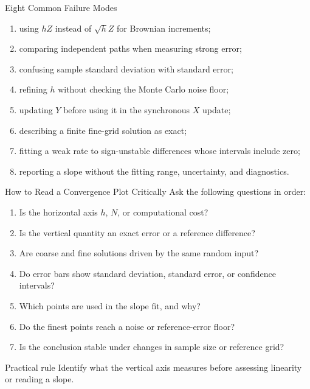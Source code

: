 \documentclass[aspectratio=169,10pt]{beamer}
\begin{document}
\begin{frame}{Eight Common Failure Modes}
  \begin{enumerate}
    \item using $hZ$ instead of $\sqrt h Z$ for Brownian increments;
    \item comparing independent paths when measuring strong error;
    \item confusing sample standard deviation with standard error;
    \item refining $h$ without checking the Monte Carlo noise floor;
    \item updating $Y$ before using it in the synchronous $X$ update;
    \item describing a finite fine-grid solution as exact;
    \item fitting a weak rate to sign-unstable differences whose intervals include zero;
    \item reporting a slope without the fitting range, uncertainty, and diagnostics.
  \end{enumerate}
\end{frame}

\begin{frame}{How to Read a Convergence Plot Critically}
  Ask the following questions in order:
  \begin{enumerate}
    \item Is the horizontal axis $h$, $N$, or computational cost?
    \item Is the vertical quantity an exact error or a reference difference?
    \item Are coarse and fine solutions driven by the same random input?
    \item Do error bars show standard deviation, standard error, or confidence intervals?
    \item Which points are used in the slope fit, and why?
    \item Do the finest points reach a noise or reference-error floor?
    \item Is the conclusion stable under changes in sample size or reference grid?
  \end{enumerate}
  \begin{alertblock}{Practical rule}
    Identify what the vertical axis measures before assessing linearity or reading a slope.
  \end{alertblock}
\end{frame}
\end{document}
